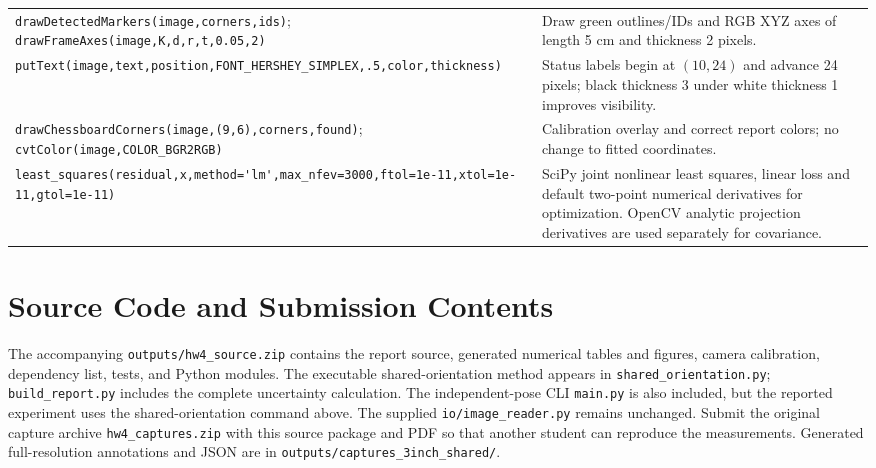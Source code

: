 \documentclass[conference,letterpaper]{IEEEtran}
\newcommand{\code}[1]{\nolinkurl{#1}}
\begin{document}
\begin{table}[t]
\begin{tabular}{L{.43\textwidth}L{.51\textwidth}}
\code{drawDetectedMarkers(image,corners,ids)}; \code{drawFrameAxes(image,K,d,r,t,0.05,2)} & Draw green outlines/IDs and RGB XYZ axes of length 5 cm and thickness 2 pixels.\\
\code{putText(image,text,position,FONT_HERSHEY_SIMPLEX,.5,color,thickness)} & Status labels begin at $(10,24)$ and advance 24 pixels; black thickness 3 under white thickness 1 improves visibility.\\
\code{drawChessboardCorners(image,(9,6),corners,found)}; \code{cvtColor(image,COLOR_BGR2RGB)} & Calibration overlay and correct report colors; no change to fitted coordinates.\\
\code{least_squares(residual,x,method='lm',max_nfev=3000,ftol=1e-11,xtol=1e-11,gtol=1e-11)} & SciPy joint nonlinear least squares, linear loss and default two-point numerical derivatives for optimization. OpenCV analytic projection derivatives are used separately for covariance.\\\bottomrule
\end{tabular}
\end{table}

\section{Source Code and Submission Contents}
The accompanying \code{outputs/hw4_source.zip} contains the report source, generated numerical tables and figures, camera calibration, dependency list, tests, and Python modules. The executable shared-orientation method appears in \code{shared_orientation.py}; \code{build_report.py} includes the complete uncertainty calculation. The independent-pose CLI \code{main.py} is also included, but the reported experiment uses the shared-orientation command above. The supplied \code{io/image_reader.py} remains unchanged. Submit the original capture archive \code{hw4_captures.zip} with this source package and PDF so that another student can reproduce the measurements. Generated full-resolution annotations and JSON are in \code{outputs/captures_3inch_shared/}.
\end{document}
